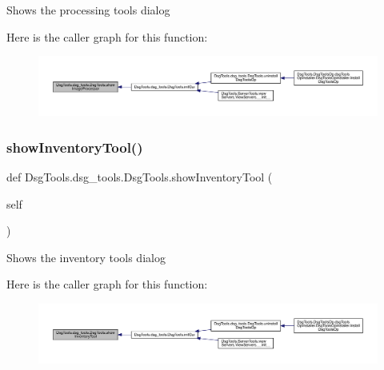 \begin{DoxyVerb}Shows the processing tools dialog
\end{DoxyVerb}
 Here is the caller graph for this function\+:
\nopagebreak
\begin{figure}[H]
\begin{center}
\leavevmode
\includegraphics[width=350pt]{class_dsg_tools_1_1dsg__tools_1_1_dsg_tools_a183fb5ffe42d20a7d8ee6d7487c47d11_icgraph}
\end{center}
\end{figure}
\mbox{\label{class_dsg_tools_1_1dsg__tools_1_1_dsg_tools_a9474a90cfdf5723b78a2a7f36ac12065}} 
\subsubsection{\texorpdfstring{show\+Inventory\+Tool()}{showInventoryTool()}}
{\footnotesize\ttfamily def Dsg\+Tools.\+dsg\+\_\+tools.\+Dsg\+Tools.\+show\+Inventory\+Tool (\begin{DoxyParamCaption}\item[{}]{self }\end{DoxyParamCaption})}

\begin{DoxyVerb}Shows the inventory tools dialog
\end{DoxyVerb}
 Here is the caller graph for this function\+:
\nopagebreak
\begin{figure}[H]
\begin{center}
\leavevmode
\includegraphics[width=350pt]{class_dsg_tools_1_1dsg__tools_1_1_dsg_tools_a9474a90cfdf5723b78a2a7f36ac12065_icgraph}
\end{center}
\end{figure}
\mbox{\label{class_dsg_tools_1_1dsg__tools_1_1_dsg_tools_aba5782d2c3d5a44dfc69e9111e3c589f}} 
